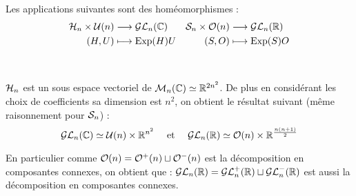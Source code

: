 \begin{theo}

Les applications suivantes sont des homéomorphismes :
\begin{align*}
 \H_n\times\U(n) & \longrightarrow \GL_n(\C) &
 \S_n\times\O(n) & \longrightarrow \GL_n(\R) \\
 (H,U)          & \longmapsto \Exp(H)U      & 
 (S,O)          & \longmapsto \Exp(S)O      \\
\end{align*}
\end{theo}

\begin{example}[Application]\

$\H_n$ est un sous espace vectoriel de $\M_n(\C)\simeq\R^{2n^2}$. De plus
en considérant les choix de coefficients sa dimension est $n^2$, on obtient
le résultat suivant (même raisonnement pour $\S_n$) :
\begin{displaymath}
 \GL_n(\C)\simeq\U(n)\times\R^{n^2} \quad \text{ et } \quad
 \GL_n(\R)\simeq\O(n)\times\R^{\frac{n(n+1)}{2}}
\end{displaymath}

En particulier comme $\O(n) = \O^+(n) \sqcup \O^-(n)$ est la décomposition en
composantes connexes, on obtient que :
$\GL_n(\R) = \GL^+_n(\R) \sqcup \GL_n^-(\R)$ est aussi la décomposition en
composantes connexes.
\end{example}






























